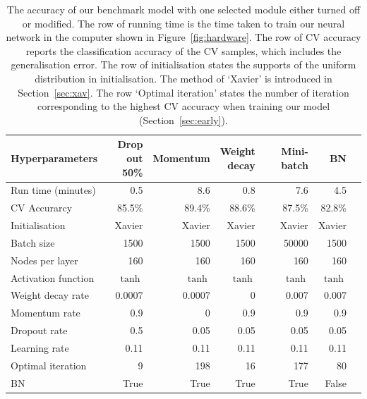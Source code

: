 \begin{table}
\caption{The accuracy of our benchmark model with one selected module either turned off or modified. The row of running time is the time taken to train our neural network in the computer shown in Figure~\ref{fig:hardware}. The row of CV accuracy reports the classification accuracy of the CV samples, which includes the generalisation error. The row of initialisation states the supports of the uniform distribution in initialisation. The method of `Xavier' is introduced in Section~\ref{sec:xav}. The row `Optimal iteration' states the number of iteration corresponding to the highest CV accuracy when training our model (Section~\ref{sec:early}).
\label{tb:comp}}
\centering
{\centering
\begin{tabular}{@{}lrrrrrr@{}}
\toprule
Hyperparameters             & {\parbox[t]{1.5cm}{\raggedleft Drop \\out 50\%}  } 
& Momentum & {\parbox[t]{1.3cm}{\raggedleft Weight \\decay}} & Mini-batch & BN \\ \midrule
Run time (minutes)             & 0.5        & 8.6          & 0.8      & 7.6 & 4.5          \\
CV Accurarcy                   & 85.5\%     & 89.4\%       & 88.6\%   & 87.5\% &82.8\%       \\
Initialisation              & Xavier     & Xavier       & Xavier   & Xavier & Xavier        \\
Batch size                   & 1500       & 1500         & 1500     & 50000    & 1500        \\
Nodes per layer        & 160        & 160          & 160      & 160    & 160         \\
Activation function        & $\tanh$    & $\tanh$      & $\tanh$  & $\tanh$  & $\tanh$       \\
Weight decay rate          & 0.0007     & 0.0007       & 0        & 0.007  & 0.007        \\
Momentum rate                & 0.9        & 0            & 0.9      & 0.9    & 0.9         \\
Dropout rate                & 0.5        & 0.05         & 0.05     & 0.05    & 0.05        \\
Learning rate                & 0.11       & 0.11         & 0.11     & 0.11    & 0.11       \\
Optimal iteration       & 9          & 198          & 16       & 177     & 80       \\ 
BN       & True          & True          & True       & True     & False       \\ \bottomrule
\end{tabular}
}
\end{table}

